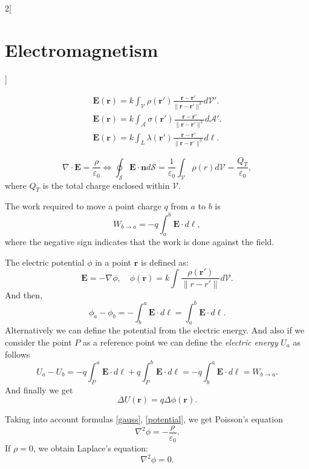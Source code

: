 \documentclass[class=article,10pt,crop=false]{standalone}
\begin{document}
\begin{multicols}{2}[\section{Electromagnetism}]
\begin{concept}
\begin{gather*}
    \boldsymbol{E}(\boldsymbol{r})=k\int_\mathcal{V}\rho(\boldsymbol{r}')\frac{\boldsymbol{r}-\boldsymbol{r}'}{\|\boldsymbol{r}-\boldsymbol{r}'\|^3}d\mathcal{V}'.\\
    \boldsymbol{E}(\boldsymbol{r})=k\int_\mathcal{A}\sigma(\boldsymbol{r}')\frac{\boldsymbol{r}-\boldsymbol{r}'}{\|\boldsymbol{r}-\boldsymbol{r}'\|^3}d\mathcal{A}'.\\
    \boldsymbol{E}(\boldsymbol{r})=k\int_L\lambda(\boldsymbol{r}')\frac{\boldsymbol{r}-\boldsymbol{r}'}{\|\boldsymbol{r}-\boldsymbol{r}'\|^3}d\ell.
\end{gather*}
\end{concept}
\begin{concept}
\begin{equation}
    \nabla\cdot\boldsymbol{E}=\frac{\rho}{\varepsilon_0}\iff\oint_\mathcal{S}\boldsymbol{E}\cdot\boldsymbol{n}d\mathcal{S}=\frac{1}{\varepsilon_0}\int_\mathcal{V}\rho(r)d\mathcal{V}=\frac{Q_T}{\varepsilon_0},
    \label{gauss}
\end{equation} where $Q_T$ is the total charge enclosed within $\mathcal{V}$.
\end{concept}
\begin{concept}[Work]
The work required to move a point charge $q$ from $a$ to $b$ is $$W_{b\to a}=-q\int_a^b\boldsymbol{E}\cdot d\ell,$$ where the negative sign indicates that the work is done against the field. 
\end{concept}
\begin{concept}
The electric potential $\phi$ in a point $\boldsymbol{r}$ is defined as: \begin{equation}
    \boldsymbol{E}=-\nabla\phi,\quad\phi(\boldsymbol{r})=k\int\frac{\rho(\boldsymbol{r}')}{\|r-r'\|}d\mathcal{V}.
    \label{potential}
\end{equation} And then, $$\phi_a-\phi_b=-\int_b^a\boldsymbol{E}\cdot d\ell=\int_a^b\boldsymbol{E}\cdot d\ell.$$ Alternatively we can define the potential from the electric energy.  And also if we consider the point $P$ as a reference point we can define the \textit{electric energy} $U_a$ as follows $$U_a-U_b=-q\int_P^a\boldsymbol{E}\cdot d\ell+q\int_P^b\boldsymbol{E}\cdot d\ell=-q\int_b^a\boldsymbol{E}\cdot d\ell=W_{b\to a}.$$ And finally we get $$\Delta U(\boldsymbol{r})=q\Delta\phi(\boldsymbol{r}).$$
\end{concept}
\begin{concept}
Taking into account formulas \ref{gauss}, \ref{potential}, we get Poisson's equation $$\nabla^2\phi=-\frac{\rho}{\varepsilon_0}.$$ If $\rho=0$, we obtain Laplace's equation: $$\nabla^2\phi=0.$$

\end{concept}
\end{multicols}
\end{document}
